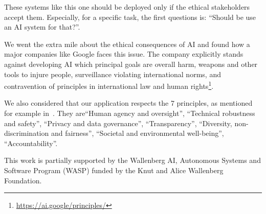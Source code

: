 \documentclass[12pt]{article}
\begin{document}
    These systems like this one should be deployed only if the ethical stakeholders accept them.
    Especially, for a specific task, the first questions is: ``Should be use an AI system for that?''.

    We went the extra mile about the ethical consequences of AI and found how a major companies like Google faces this issue.
    The company explicitly stands against developing AI which principal goals are overall harm, weapons and other tools to injure people, surveillance violating international norms, and contravention of principles in international law and human rights\footnote{\url{https://ai.google/principles/}}.

    We also considered that our application respects the 7 principles, as mentioned for example in~\cite{easa:20210401.01}.
    They are``Human agency and oversight'', ``Technical robustness and safety'', ``Privacy and data governance'', ``Transparency'', ``Diversity, non-discrimination and fairness'', ``Societal and environmental well-being'', ``Accountability''.

    \begin{ack}
        This work is partially supported by the Wallenberg AI, Autonomous Systems and Software Program (WASP) funded by the Knut and Alice Wallenberg Foundation.
    \end{ack}

    

    
\end{document}
